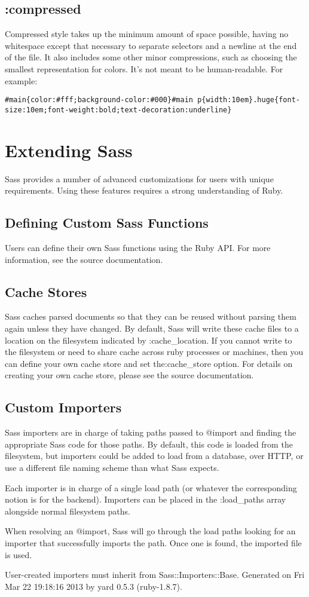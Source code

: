 \documentclass[10pt]{article}
\begin{document}
\subsection{:compressed}


 Compressed style takes up the minimum amount of space possible, having no whitespace except that necessary to separate selectors and a newline at the end of the file. It also includes some other minor compressions, such as choosing the smallest representation for colors. It’s not meant to be human-readable. For example:
\begin{verbatim}
#main{color:#fff;background-color:#000}#main p{width:10em}.huge{font-size:10em;font-weight:bold;text-decoration:underline}
\end{verbatim}
\section{Extending Sass}


 Sass provides a number of advanced customizations for users with unique requirements. Using these features requires a strong understanding of Ruby.
\subsection{Defining Custom Sass Functions}


 Users can define their own Sass functions using the Ruby API. For more information, see the source documentation.
\subsection{Cache Stores}


 Sass caches parsed documents so that they can be reused without parsing them again unless they have changed. By default, Sass will write these cache files to a location on the filesystem indicated by :cache\_location. If you cannot write to the filesystem or need to share cache across ruby processes or machines, then you can define your own cache store and set the:cache\_store option. For details on creating your own cache store, please see the source documentation.
\subsection{Custom Importers}


 Sass importers are in charge of taking paths passed to @import and finding the appropriate Sass code for those paths. By default, this code is loaded from the filesystem, but importers could be added to load from a database, over HTTP, or use a different file naming scheme than what Sass expects.


 Each importer is in charge of a single load path (or whatever the corresponding notion is for the backend). Importers can be placed in the :load\_paths array alongside normal filesystem paths.


 When resolving an @import, Sass will go through the load paths looking for an importer that successfully imports the path. Once one is found, the imported file is used.


 User-created importers must inherit from Sass::Importers::Base.
 Generated on Fri Mar 22 19:18:16 2013 by yard 0.5.3 (ruby-1.8.7). 
\end{document}
